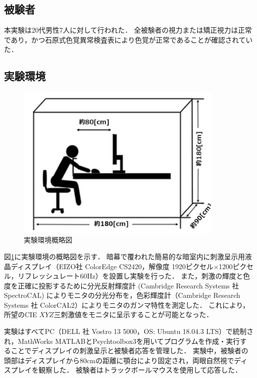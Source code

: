         \subsection{被験者}
            本実験は20代男性7人に対して行われた．
            全被験者の視力または矯正視力は正常であり，かつ石原式色覚異常検査表により色覚が正常であることが確認されていた．

        \subsection{実験環境}

            \begin{figure}[h]
                \centering
                \includegraphics[width=10.0cm]{./img/darkroom_p.png}
                \caption{実験環境概略図}
                \label{darkroom}
            \end{figure}
            
            図\ref{darkroom}に実験環境の概略図を示す．
            暗幕で覆われた簡易的な暗室内に刺激呈示用液晶ディスプレイ（EIZO社 ColorEdge CS2420，解像度 1920ピクセル$\times$1200ピクセル，リフレッシュレート60Hz）を設置し実験を行った．
            また，刺激の輝度と色度を正確に投影するために分光反射輝度計 (Cambridge Research Systems 社 SpectroCAL) によりモニタの分光分布を，色彩輝度計（Cambridge Research Systems 社 ColorCAL2）によりモニタのガンマ特性を測定した．
            これにより，所望のCIE $XYZ$三刺激値をモニタに呈示することが可能となった．
            
            実験はすべてPC（DELL 社 Vostro 13 5000，OS: Ubuntu 18.04.3 LTS）で統制され，MathWorks MATLABとPsychtoolbox3\cite{Psychtoolbox}を用いてプログラムを作成・実行することでディスプレイの刺激呈示と被験者応答を管理した．
            実験中，被験者の頭部はディスプレイから80cmの距離に顎台により固定され，両眼自然視でディスプレイを観察した．
            被験者はトラックボールマウスを使用して応答した．

